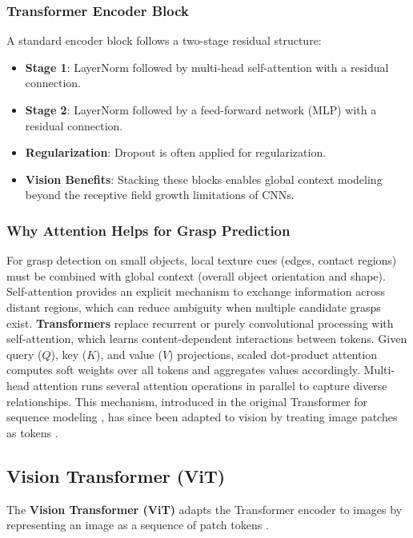 \subsubsection{Transformer Encoder Block}
A standard encoder block follows a two-stage residual structure:
\begin{itemize}
    \item \textbf{Stage 1}: LayerNorm followed by multi-head self-attention with a residual connection.
    \item \textbf{Stage 2}: LayerNorm followed by a feed-forward network (MLP) with a residual connection.
    \item \textbf{Regularization}: Dropout is often applied for regularization.
    \item \textbf{Vision Benefits}: Stacking these blocks enables global context modeling beyond the receptive field growth limitations of CNNs.
\end{itemize}

\subsubsection{Why Attention Helps for Grasp Prediction}
For grasp detection on small objects, local texture cues (edges, contact regions) must be combined with global context (overall object orientation and shape). Self-attention provides an explicit mechanism to exchange information across distant regions, which can reduce ambiguity when multiple candidate grasps exist. \textbf{Transformers} replace recurrent or purely convolutional processing with self-attention, which learns content-dependent interactions between tokens. Given query ($Q$), key ($K$), and value ($V$) projections, scaled dot-product attention computes soft weights over all tokens and aggregates values accordingly. Multi-head attention runs several attention operations in parallel to capture diverse relationships. This mechanism, introduced in the original Transformer for sequence modeling \cite{vaswani2017attention}, has since been adapted to vision by treating image patches as tokens \cite{dosovitskiy2021vit}.

\subsection{Vision Transformer (ViT)}
The \textbf{Vision Transformer (ViT)} adapts the Transformer encoder to images by representing an image as a sequence of patch tokens \cite{dosovitskiy2021vit}. 

